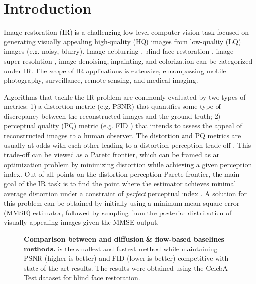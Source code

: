 \section{Introduction}


Image restoration (IR) is a challenging low-level computer vision task focused on generating visually appealing high-quality (HQ) images from low-quality (LQ) images (e.g. noisy, blurry). Image deblurring \cite{kupyn2019deblurgan,whang2022deblurring}, blind face restoration \cite{wang2021towards,li2020blind}, image super-resolution \cite{dong2012nonlocally,dong2015image}, image denoising, inpainting, and colorization can be categorized under IR. The scope of IR applications is extensive, encompassing mobile photography, surveillance, remote sensing, and medical imaging.  

Algorithms that tackle the IR problem are commonly evaluated by two types of metrics: 1) a distortion metric (e.g. PSNR) that quantifies some type of discrepancy between the reconstructed images and the ground truth; 2) perceptual quality (PQ) metric (e.g. FID \cite{heusel2017gans}) that intends to assess the appeal of reconstructed images to a human observer. The distortion and PQ metrics are usually
at odds with each other leading to a distortion-perception trade-off \cite{blau2018perception}. This trade-off can be viewed as a Pareto frontier, which can be framed as an optimization problem by minimizing distortion while achieving a given perception index. Out of all points on the distortion-perception Pareto frontier, the main goal of the IR task is to find the point where the estimator achieves minimal average distortion under a constraint of \emph{perfect} perceptual index \cite{ohayon2024posterior}. A solution for this problem \cite{freirich2021a} can be obtained by initially using a minimum mean square error (MMSE) estimator, followed by sampling from the posterior distribution of visually appealing images given the MMSE output.


\begin{figure*}[t] 

\caption{\textbf{Comparison between \name and diffusion \& flow-based baselines methods.} \name is the smallest and fastest method while maintaining PSNR (higher is better) and FID (lower is better) competitive with state-of-the-art results. The results were obtained using the CelebA-Test dataset for blind face restoration.}
\label{fig:performance}
\end{figure*}


